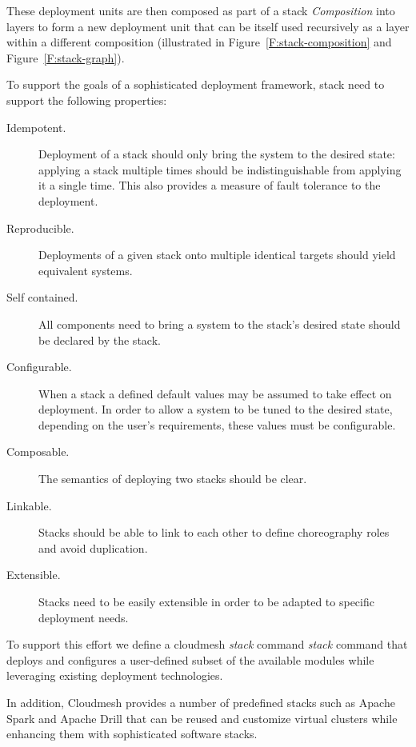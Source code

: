 These deployment units are then composed as part of a stack {\it
  Composition} into layers to form a new deployment unit that can be
itself used recursively as a layer within a different composition
(illustrated in Figure~\ref{F:stack-composition} and Figure~\ref{F:stack-graph}).



To support the goals of a sophisticated deployment framework, stack
need to support the following properties:

\begin{description}

\item [Idempotent.]  Deployment of a stack should only bring the
  system to the desired state: applying a stack multiple times should
  be indistinguishable from applying it a single time. This also
  provides a measure of fault tolerance to the deployment.

\item [Reproducible.] Deployments of a given stack onto multiple
  identical targets should yield equivalent systems.

\item [Self contained.] All components need to bring a system to the
  stack's desired state should be declared by the stack.

\item [Configurable.] When a stack a defined default values may be
  assumed to take effect on deployment. In order to allow a system to
  be tuned to the desired state, depending on the user's requirements,
  these values must be configurable.

\item [Composable.] The semantics of deploying two stacks should be clear.

\item [Linkable.] Stacks should be able to link to each other to
  define choreography roles and avoid duplication.

\item [Extensible.] Stacks need to be easily extensible in order to be
  adapted to specific deployment needs.

\end{description}

To support this effort we define a cloudmesh {\em stack} command {\it
  stack} command that deploys and configures a user-defined subset of
the available modules while leveraging existing deployment
technologies.

In addition, Cloudmesh provides a number of predefined stacks such as
Apache Spark and Apache Drill that can be reused and customize virtual
clusters while enhancing them with sophisticated software stacks. 

